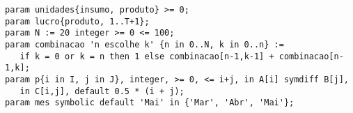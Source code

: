 \documentclass[11pt, brazil]{report}
\def\para#1{\noindent{\bf#1}}
\begin{document}

\vspace*{-8pt}

\para{Exemplos}


\begin{verbatim}
param unidades{insumo, produto} >= 0;
param lucro{produto, 1..T+1};
param N := 20 integer >= 0 <= 100;
param combinacao 'n escolhe k' {n in 0..N, k in 0..n} :=
   if k = 0 or k = n then 1 else combinacao[n-1,k-1] + combinacao[n-1,k];
param p{i in I, j in J}, integer, >= 0, <= i+j, in A[i] symdiff B[j],
   in C[i,j], default 0.5 * (i + j);
param mes symbolic default 'Mai' in {'Mar', 'Abr', 'Mai'};
\end{verbatim}
\end{document}
